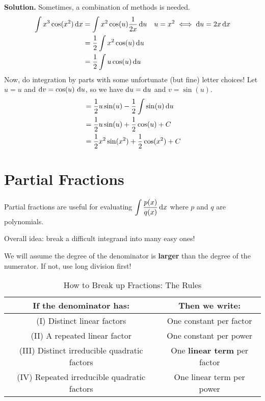 \begin{Example}{}{}
\begin{enumerate}[label=(\roman*)]
              \textbf{Solution.} Sometimes, a combination of methods is needed.
              \begin{align*}
                  \int x^3\cos(x^2)\odif{x}
                   & =\int x^2\cos(u)\frac{1}{2x} \odif{u} &  & u=x^2\iff \odif{u}=2x\odif{x} \\
                   & =\frac{1}{2} \int x^2\cos(u)\odif{u}                                     \\
                   & =\frac{1}{2} \int u\cos(u)\odif{u}                                       \\
              \end{align*}
              Now, do integration by parts with some unfortunate (but fine) letter
              choices! Let $ u=u $ and $ \odif{v}=\cos(u)\,\odif{u} $, so we have $ \odif{u}=\odif{u} $
              and $ v=\sin(u) $.
              \begin{align*}
                   & =\frac{1}{2} u\sin(u)-\frac{1}{2} \int \sin(u)\odif{u} \\
                   & =\frac{1}{2} u\sin(u)+\frac{1}{2} \cos(u)+C            \\
                   & =\frac{1}{2} x^2\sin(x^2)+\frac{1}{2} \cos(x^2)+C
              \end{align*}
    \end{enumerate}
\end{Example}

\section{Partial Fractions}
Partial fractions are useful for evaluating $ \displaystyle \int \frac{p(x)}{q(x)} \odif{x} $
where $ p $ and $ q $ are polynomials.

Overall idea: break a difficult integrand into many easy ones!
\begin{Remark}{}{}
    We will assume the degree of the denominator is \textbf{larger} than the
    degree of the numerator. If not, use long division first!
\end{Remark}

\begin{table}[!htbp]
    \centering
    \caption{How to Break up Fractions: The Rules}
    \begin{tabular}{cc}
        \toprule
        If the denominator has:                      & Then we write:                      \\
        \midrule
        (I) Distinct linear factors                  & One constant per factor             \\
        (II) A repeated linear factor                & One constant per power              \\
        (III) Distinct irreducible quadratic factors & One \textbf{linear term} per factor \\
        (IV) Repeated irreducible quadratic factors  & One linear term per power
    \end{tabular}
\end{table}

